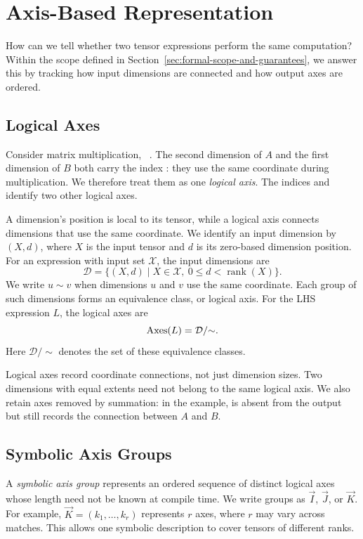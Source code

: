 \section{Axis-Based Representation}
\label{sec:axis-based-representation}
How can we tell whether two tensor expressions perform the same computation?
Within the scope defined in Section~\ref{sec:formal-scope-and-guarantees}, we answer this
by tracking how input dimensions are connected and how output axes are ordered.

\subsection{Logical Axes}
\label{sec:logical-axes}
Consider matrix multiplication,
~\cite{numpy-einsum}.
The second dimension of $A$ and the first dimension of $B$ both
carry the index : they use the same coordinate during
multiplication. We therefore treat them as one \emph{logical axis}.
The indices  and  identify two other logical axes.

A dimension's position is local to its tensor, while a logical axis
connects dimensions that use the same coordinate.
We identify an input dimension by $(X,d)$, where $X$ is the input
tensor and $d$ is its zero-based dimension position.
For an expression with input set $\mathcal X$, the input dimensions are
\begin{equation}
 \mathcal D=\{(X,d)\mid X\in\mathcal X,\ 0\le d<\operatorname{rank}(X)\}.
\end{equation}
We write $u\sim v$ when dimensions $u$ and $v$ use the same coordinate.
Each group of such dimensions forms an equivalence class, or logical
axis. For the LHS expression $L$, the logical axes are
\begin{equation}
 \operatorname{Axes}(L)=\mathcal D/{\sim}.
\end{equation}
Here $\mathcal D/{\sim}$ denotes the set of these equivalence classes.

Logical axes record coordinate connections, not just dimension sizes.
Two dimensions with equal extents need not belong to the same logical
axis. We also retain axes removed by summation: in the example,
 is absent from the output but still records the connection
between $A$ and $B$.

\subsection{Symbolic Axis Groups}
\label{sec:symbolic-axis-groups}
A \emph{symbolic axis group} represents an ordered sequence of distinct
logical axes whose length need not be known at compile time. We write groups
as $\vec I$, $\vec J$, or $\vec K$. For example,
$\vec K=(k_1,\ldots,k_r)$ represents $r$ axes, where $r$ may vary across
matches. This allows one symbolic description to cover tensors of different
ranks.

